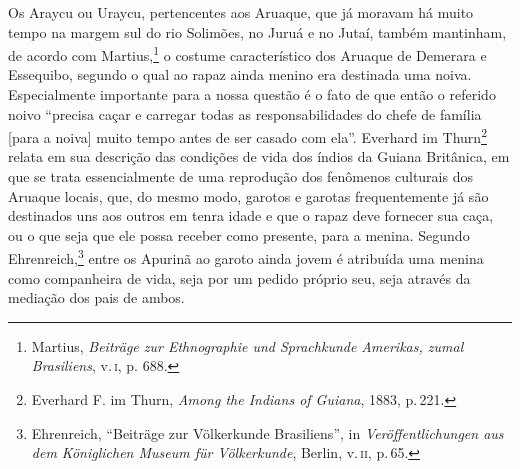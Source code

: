 Os Araycu ou Uraycu, pertencentes aos Aruaque, que já moravam há muito
tempo na margem sul do rio Solimões, no Juruá e no Jutaí, também
mantinham, de acordo com Martius,\footnote{Martius, \textit{Beiträge zur
  Ethnographie und Sprachkunde Amerikas, zumal Brasiliens}, v.\,\textsc{i}, p.
  688.} o costume característico dos Aruaque de Demerara e Essequibo,
segundo o qual ao rapaz ainda menino era destinada uma noiva.
Especialmente importante para a nossa questão é o fato de que então o
referido noivo ``precisa caçar e carregar todas as responsabilidades do
chefe de família {[}para a noiva{]} muito tempo antes de ser casado com
ela''. Everhard im Thurn\footnote{Everhard F. im Thurn, \textit{Among the
  Indians of Guiana}, 1883, p.\,221.} relata em sua descrição das
condições de vida dos índios da Guiana Britânica, em que se trata
essencialmente de uma reprodução dos fenômenos culturais dos Aruaque
locais, que, do mesmo modo, garotos e garotas frequentemente já são
destinados uns aos outros em tenra idade e que o rapaz deve fornecer sua
caça, ou o que seja que ele possa receber como presente, para a menina.
Segundo Ehrenreich,\footnote{Ehrenreich, ``Beiträge zur Völkerkunde
  Brasiliens'', in \textit{Veröffentlichungen aus dem Königlichen Museum
  für Völkerkunde}, Berlin, v.\,\textsc{ii}, p.\,65.} entre os Apurinã ao garoto
ainda jovem é atribuída uma menina como companheira de vida, seja por um
pedido próprio seu, seja através da mediação dos pais de ambos.


